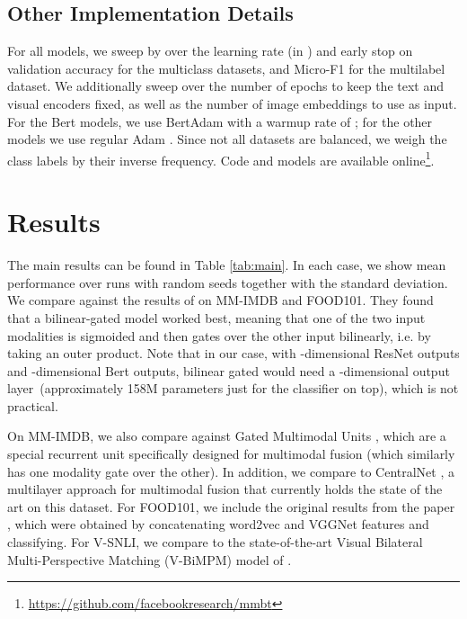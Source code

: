 \documentclass[11pt,a4paper]{article}
\begin{document}
\subsection{Other Implementation Details} For all models, we sweep by over the learning rate (in ) and early stop on validation accuracy for the multiclass datasets, and Micro-F1 for the multilabel dataset. We additionally sweep over the number of epochs to keep the text and visual encoders fixed, as well as the number of image embeddings to use as input. For the Bert models, we use BertAdam \cite{Devlin:2019naacl} with a warmup rate of ; for the other models we use regular Adam \cite{Kingma:2014adam}. Since not all datasets are balanced, we weigh the class labels by their inverse frequency. Code and models are available online\footnote{\href{https://github.com/facebookresearch/mmbt}{https://github.com/facebookresearch/mmbt}}.

\section{Results}

The main results can be found in Table \ref{tab:main}. In each case, we show mean performance over  runs with random seeds together with the standard deviation. We compare against the results of \cite{Kiela:2018aaai} on MM-IMDB and FOOD101. They found that a bilinear-gated model worked best, meaning that one of the two input modalities is sigmoided and then gates over the other input bilinearly, i.e. by taking an outer product. Note that in our case, with -dimensional ResNet outputs and -dimensional Bert outputs, bilinear gated would need a -dimensional output layer~(approximately 158M parameters just for the classifier on top), which is not practical.

On MM-IMDB, we also compare against Gated Multimodal Units \cite{Arevalo:2017mmimdb}, which are a special recurrent unit specifically designed for multimodal fusion (which similarly has one modality gate over the other). In addition, we compare to CentralNet \cite{Vielzeuf:2018eccv}, a multilayer approach for multimodal fusion that currently holds the state of the art on this dataset. For FOOD101, we include the original results from the paper \cite{Wang:2015food101}, which were obtained by concatenating word2vec and VGGNet features and classifying. For V-SNLI, we compare to the state-of-the-art Visual Bilateral Multi-Perspective Matching (V-BiMPM) model of \cite{Vu:2018vsnli}.
\end{document}
